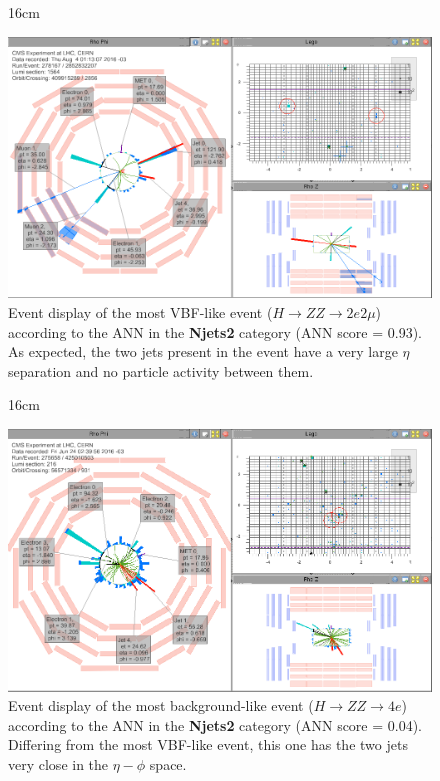 
\begin{figure}[H!]{16cm}
	\vspace{-20cm}
	\caption{Event display of the most VBF-like event ($H \rightarrow ZZ \rightarrow 2e2\mu$) according to the ANN in the \textbf{Njets2} category (ANN score = 0.93). As expected, the two jets present in the event have a very large $\eta$ separation and no particle activity between them.}
	\includegraphics[scale=0.7,angle=90]{ChapterAnalysis/figs/event_display_Run278167_Lumi1564_Event2852832207_Njets2_ANN0p93_DoubleEG_Run2016F_2}
\end{figure}

\begin{figure}[H!]{16cm}
	\caption{Event display of the most background-like event ($H \rightarrow ZZ \rightarrow 4e$) according to the ANN in the \textbf{Njets2} category (ANN score = 0.04). Differing from the most VBF-like event, this one has the two jets very close in the $\eta-\phi$ space.}
	\includegraphics[scale=0.7,angle=90]{ChapterAnalysis/figs/event_display_Run275658_Lumi216_Event425010503_Njets2_ANN0p15_DoubleEG_Run2016C_2}
\end{figure}

